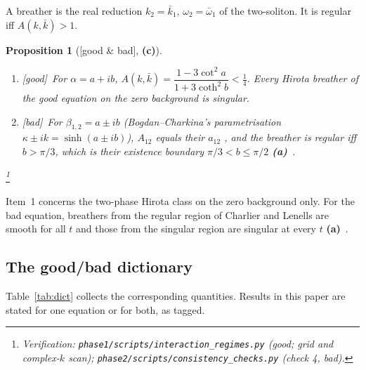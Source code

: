 \documentclass[11pt,a4paper]{article}
\newcommand{\lab}[1]{{\normalfont\sffamily\footnotesize\bfseries(#1)}}
\newcommand{\La}{\lab{a}}
\newcommand{\Lc}{\lab{c}}
\newcommand{\eqtag}[2]{{\normalfont\sffamily\footnotesize\textcolor{#1}{[#2]}}}
\newcommand{\Good}{\eqtag{teal!70!black}{good}}
\newcommand{\Bad}{\eqtag{red!60!black}{bad}}
\newcommand{\Both}{\eqtag{violet!70!black}{good \& bad}}
\newcommand{\scr}[1]{\nolinkurl{#1}}
\newcommand{\chk}[1]{\footnote{\raggedright Verification: #1.}}
\newtheorem{proposition}{Proposition}[section]
\theoremstyle{remark}
\begin{document}
A breather is the real reduction $k_2=\bar k_1$, $\omega_2=\bar\omega_1$ of the two-soliton. It is regular iff $A(k,\bar k)>1$.

\begin{proposition}[\Both, \Lc]\label{prop:nobreather}
\begin{enumerate}
\item \Good\ For $\alpha=a+ib$, $A(k,\bar k)=\dfrac{1-3\cot^2a}{1+3\coth^2b}<\tfrac14$. Every Hirota breather of the good equation on the zero background is singular.
\item \Bad\ For $\beta_{1,2}=a\pm ib$ (Bogdan--Charkina's parametrisation $\kappa\pm ik=\sinh(a\pm ib)$), $A_{12}$ equals their $a_{12}$ \cite[(33)]{BC}, and the breather is regular iff $b>\pi/3$, which is their existence boundary $\pi/3<b\le\pi/2$ \La~\cite[(29)--(41)]{BC}.
\end{enumerate}
\chk{\scr{phase1/scripts/interaction_regimes.py} (good; grid and complex-$k$ scan); \scr{phase2/scripts/consistency_checks.py} (check 4, bad)}
\end{proposition}
Item~1 concerns the two-phase Hirota class on the zero background only. For the bad equation, breathers from the regular region of Charlier and Lenells are smooth for all $t$ and those from the singular region are singular at every $t$ \La~\cite[Lemma~A.4]{CL-SOL}.

\subsection{The good/bad dictionary}\label{sec:dictionary}

Table~\ref{tab:dict} collects the corresponding quantities. Results in this paper are stated for one equation or for both, as tagged.
\end{document}
